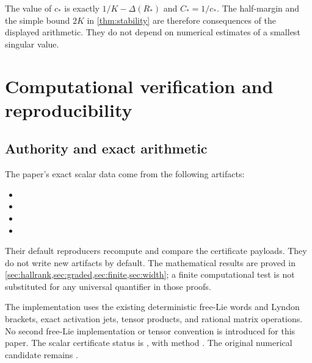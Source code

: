 \documentclass[11pt,a4paper]{article}
\numberwithin{equation}{section}
\theoremstyle{definition}
\theoremstyle{remark}
\begin{document}
The value of $c_*$ is exactly $1/K-\Delta(R_*)$ and $C_*=1/c_*$.
The half-margin and the simple bound $2K$ in \cref{thm:stability} are
therefore consequences of the displayed arithmetic. They do not depend
on numerical estimates of a smallest singular value.

\section{Computational verification and reproducibility}
\label{app:reproduce}
\subsection{Authority and exact arithmetic}
The paper's exact scalar data come from the following artifacts:
\begin{itemize}[nosep]
\item {}
\item {}
\item {}
\item {}
\end{itemize}
Their default reproducers recompute and compare the certificate payloads.
They do not write new artifacts by default. The mathematical results
are proved in \cref{sec:hallrank,sec:graded,sec:finite,sec:width}; a finite computational
test is not substituted for any universal quantifier in those proofs.

The implementation uses the existing deterministic free-Lie words and
Lyndon brackets, exact activation jets, tensor products, and rational
matrix operations. No second free-Lie implementation or tensor convention
is introduced for this paper. The scalar certificate status is
, with method
. The original numerical
candidate remains .
\end{document}
